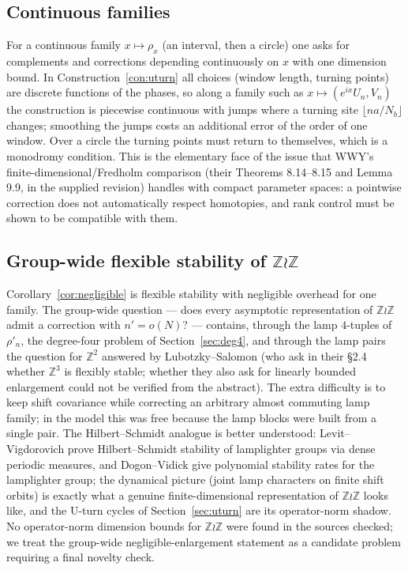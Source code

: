 \documentclass[11pt]{amsart}
\theoremstyle{definition}
\theoremstyle{remark}
\newcommand{\Z}{\mathbb Z}
\begin{document}
\subsection{Continuous families}

For a continuous family $x\mapsto\rho_x$ (an interval, then a circle) one asks for complements and corrections depending continuously on $x$ with one dimension bound. In Construction~\ref{con:uturn} all choices (window length, turning points) are discrete functions of the phases, so along a family such as $x\mapsto(e^{ix}U_n,V_n)$ the construction is piecewise continuous with jumps where a turning site $\lfloor na/N_b\rfloor$ changes; smoothing the jumps costs an additional error of the order of one window. Over a circle the turning points must return to themselves, which is a monodromy condition. This is the elementary face of the issue that WWY's finite-dimensional/Fredholm comparison (their Theorems 8.14--8.15 and Lemma 9.9, in the supplied revision) handles with compact parameter spaces: a pointwise correction does not automatically respect homotopies, and rank control must be shown to be compatible with them.

\subsection{Group-wide flexible stability of $\Z\wr\Z$}

Corollary~\ref{cor:negligible} is flexible stability with negligible overhead for one family. The group-wide question --- does every asymptotic representation of $\Z\wr\Z$ admit a correction with $n'=o(N)$? --- contains, through the lamp $4$-tuples of $\rho'_n$, the degree-four problem of Section~\ref{sec:deg4}, and through the lamp pairs the question for $\Z^2$ answered by Lubotzky--Salomon \cite{LS26} (who ask in their \S2.4 whether $\Z^3$ is flexibly stable; whether they also ask for linearly bounded enlargement could not be verified from the abstract). The extra difficulty is to keep shift covariance while correcting an arbitrary almost commuting lamp family; in the model this was free because the lamp blocks were built from a single pair. The Hilbert--Schmidt analogue is better understood: Levit--Vigdorovich \cite{LV23} prove Hilbert--Schmidt stability of lamplighter groups via dense periodic measures, and Dogon--Vidick \cite{DV26} give polynomial stability rates for the lamplighter group; the dynamical picture (joint lamp characters on finite shift orbits) is exactly what a genuine finite-dimensional representation of $\Z\wr\Z$ looks like, and the U-turn cycles of Section~\ref{sec:uturn} are its operator-norm shadow. No operator-norm dimension bounds for $\Z\wr\Z$ were found in the sources checked; we treat the group-wide negligible-enlargement statement as a candidate problem requiring a final novelty check.
\end{document}
